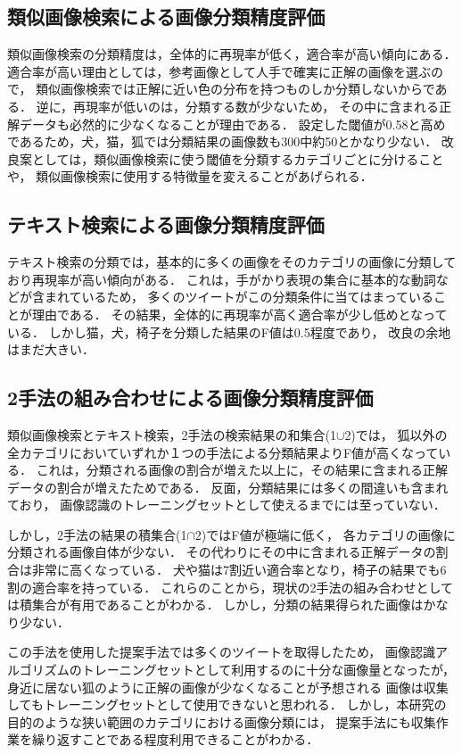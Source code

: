 \documentclass{deimj}
\begin{document}
\subsection{類似画像検索による画像分類精度評価}
類似画像検索の分類精度は，全体的に再現率が低く，適合率が高い傾向にある．
適合率が高い理由としては，参考画像として人手で確実に正解の画像を選ぶので，
類似画像検索では正解に近い色の分布を持つものしか分類しないからである．
逆に，再現率が低いのは，分類する数が少ないため，
その中に含まれる正解データも必然的に少なくなることが理由である．
設定した閾値が0.58と高めであるため，犬，猫，狐では分類結果の画像数も300中約50とかなり少ない．
改良案としては，類似画像検索に使う閾値を分類するカテゴリごとに分けることや，
類似画像検索に使用する特徴量を変えることがあげられる．

\subsection{テキスト検索による画像分類精度評価}

テキスト検索の分類では，基本的に多くの画像をそのカテゴリの画像に分類しており再現率が高い傾向がある．
これは，手がかり表現の集合に基本的な動詞などが含まれているため，
多くのツイートがこの分類条件に当てはまっていることが理由である．
その結果，全体的に再現率が高く適合率が少し低めとなっている．
しかし猫，犬，椅子を分類した結果のF値は0.5程度であり，
改良の余地はまだ大きい．

\subsection{2手法の組み合わせによる画像分類精度評価}
類似画像検索とテキスト検索，2手法の検索結果の和集合(1$\cup$2)では，
狐以外の全カテゴリにおいていずれか１つの手法による分類結果よりF値が高くなっている．
これは，分類される画像の割合が増えた以上に，その結果に含まれる正解データの割合が増えたためである．
反面，分類結果には多くの間違いも含まれており，
画像認識のトレーニングセットとして使えるまでには至っていない．

しかし，2手法の結果の積集合(1$\cap$2)ではF値が極端に低く，
各カテゴリの画像に分類される画像自体が少ない．
その代わりにその中に含まれる正解データの割合は非常に高くなっている．
犬や猫は7割近い適合率となり，椅子の結果でも6割の適合率を持っている．
これらのことから，現状の2手法の組み合わせとしては積集合が有用であることがわかる．
しかし，分類の結果得られた画像はかなり少ない．

この手法を使用した提案手法では多くのツイートを取得したため，
画像認識アルゴリズムのトレーニングセットとして利用するのに十分な画像量となったが，
身近に居ない狐のように正解の画像が少なくなることが予想される
画像は収集してもトレーニングセットとして使用できないと思われる．
しかし，本研究の目的のような狭い範囲のカテゴリにおける画像分類には，
提案手法にも収集作業を繰り返すことである程度利用できることがわかる．
\end{document}
